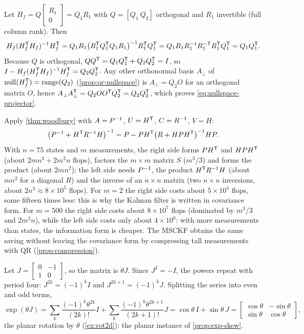 \begin{solutions}
  \item Let $H_f = Q\begin{bmatrix}R_1\\0\end{bmatrix} = Q_1R_1$ with $Q = [Q_1\ Q_2]$ orthogonal and $R_1$ invertible (full column rank). Then
        \[
          H_f(H_f^{\mathsf{T}} H_f)^{-1} H_f^{\mathsf{T}} = Q_1R_1\big(R_1^{\mathsf{T}} Q_1^{\mathsf{T}} Q_1R_1\big)^{-1} R_1^{\mathsf{T}} Q_1^{\mathsf{T}} = Q_1R_1R_1^{-1} R_1^{-\mathsf{T}} R_1^{\mathsf{T}} Q_1^{\mathsf{T}} = Q_1Q_1^{\mathsf{T}} .
        \]
        Because $Q$ is orthogonal, $QQ^{\mathsf{T}} = Q_1Q_1^{\mathsf{T}} + Q_2Q_2^{\mathsf{T}} = I$, so $I - H_f(H_f^{\mathsf{T}} H_f)^{-1} H_f^{\mathsf{T}} = Q_2Q_2^{\mathsf{T}}$. Any other orthonormal basis $A_\perp$ of
        $\operatorname{null}(H_f^{\mathsf{T}}) = \operatorname{range}(Q_2)$ (\cref{prop:qr-nullspace}) is $A_\perp = Q_2O$ for an orthogonal matrix $O$, hence
        $A_\perp A_\perp^{\mathsf{T}} = Q_2OO^{\mathsf{T}} Q_2^{\mathsf{T}} = Q_2Q_2^{\mathsf{T}}$, which proves \eqref{eq:nullspace-projector}.

  \item Apply \cref{thm:woodbury} with $A = P^{-1}$, $U = H^{\mathsf{T}}$, $C = R^{-1}$, $V = H$:
        \[
          \big(P^{-1} + H^{\mathsf{T}} R^{-1} H\big)^{-1} = P - PH^{\mathsf{T}}\big(R + HPH^{\mathsf{T}}\big)^{-1} HP .
        \]
        With $n = 75$ states and $m$ measurements, the right side forms $PH^{\mathsf{T}}$ and $HPH^{\mathsf{T}}$ (about $2mn^2 + 2m^2n$ flops), factors the $m\times m$
        matrix $S$ ($m^3/3$) and forms the product (about $2mn^2$); the left side needs $P^{-1}$, the product $H^{\mathsf{T}} R^{-1} H$ (about $mn^2$ for a
        diagonal $R$) and the inverse of an $n\times n$ matrix (two $n\times n$ inversions, about $2n^3 \approx 8\times10^5$ flops). For $m = 2$ the
        right side costs about $5\times10^4$ flops, some fifteen times less: this is why the Kalman filter is written in covariance form. For
        $m = 500$ the right side costs about $8\times10^7$ flops (dominated by $m^3/3$ and $2m^2n$), while the left side costs only about
        $4\times10^6$: with more measurements than states, the information form is cheaper. The MSCKF obtains the same saving without leaving
        the covariance form by compressing tall measurements with QR (\cref{prop:compression}).

  \item Let $J = \begin{bmatrix}0 & -1\\ 1 & 0\end{bmatrix}$, so the matrix is $\theta J$. Since $J^2 = -I$, the powers repeat with period four:
        $J^{2k} = (-1)^kI$ and $J^{2k+1} = (-1)^kJ$. Splitting the series into even and odd terms,
        \[
          \exp(\theta J) = \sum_k\frac{(-1)^k\theta^{2k}}{(2k)!}I + \sum_k\frac{(-1)^k\theta^{2k+1}}{(2k+1)!}J = \cos\theta\,I + \sin\theta\,J
          = \begin{bmatrix}\cos\theta & -\sin\theta\\ \sin\theta & \cos\theta\end{bmatrix},
        \]
        the planar rotation by $\theta$ (\cref{ex:rot2d}): the planar instance of \cref{prop:exp-skew}.


\end{solutions}

